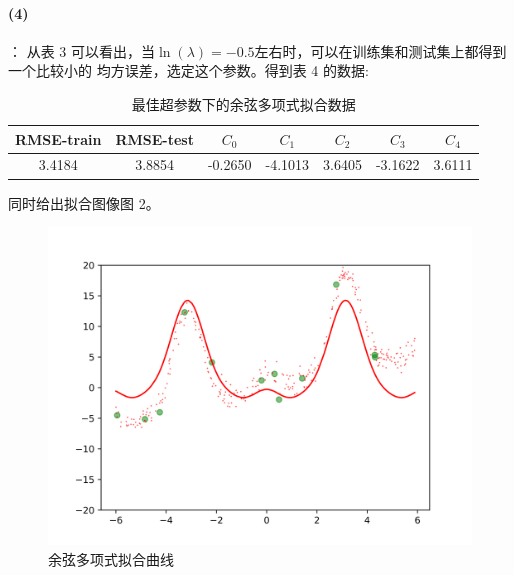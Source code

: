 \documentclass[a4paper,zihao=5,UTF8]{ctexart}
\begin{document}
    \paragraph{(4)}：
    从表 3 可以看出，当$\ln(\lambda) = -0.5$左右时，可以在训练集和测试集上都得到一个比较小的
    均方误差，选定这个参数。得到表 4 的数据:
    \begin{table}[htbp]
        \centering
        \caption{最佳超参数下的余弦多项式拟合数据}
        \begin{tabular}[htbp]{ccccccc}
            \toprule
            RMSE-train & RMSE-test & $C_0$ & $C_1$ & $C_2$ & $C_3$ & $C_4$\\
            \midrule
            3.4184 & 3.8854 & -0.2650 & -4.1013 & 3.6405 & -3.1622 & 3.6111 \\
            \bottomrule
        \end{tabular}
        \label{poly-cos curve table}
    \end{table}
    同时给出拟合图像图 2。
    \begin{figure}[htbp]
        \centering
        \includegraphics[scale=0.8]{fit_curve_poly-cos.png}
        \caption{余弦多项式拟合曲线}
    \end{figure}
\end{document}
